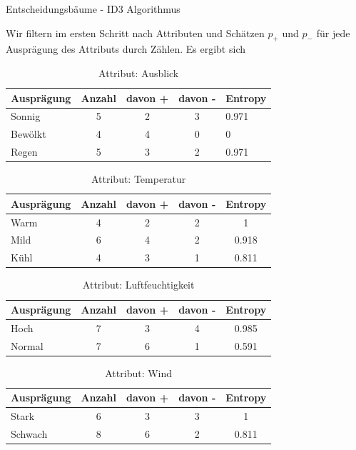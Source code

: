 \begin{task}[credit=16]{Entscheidungsbäume - ID3 Algorithmus}
\begin{subtask}[points=10,title=ID3 Algorithmus]
\begin{solution}
Wir filtern im ersten Schritt nach Attributen und Schätzen $p_+$ und $p_-$ für jede Ausprägung des Attributs durch Zählen. Es ergibt sich
\begin{table}[H]
	\centering
	\caption{Attribut: Ausblick}
	\begin{tabular}{l|c|c|c|l}
		\toprule
		\textbf{Ausprägung} & \textbf{Anzahl} & \textbf{davon +}  & \textbf{davon -} &\textbf{Entropy} \\
		\midrule
		Sonnig    & 5 &2&3&0.971   \\
		Bewölkt & 4&4&0&0  \\
		Regen    & 5&3&2&0.971    \\
		\bottomrule
	\end{tabular}
\end{table}
\begin{table}[H]
	\centering
	\caption{Attribut: Temperatur}
	\begin{tabular}{l|c|c|c|c}
		\toprule
		\textbf{Ausprägung} & \textbf{Anzahl} & \textbf{davon +}  & \textbf{davon -} &\textbf{Entropy} \\
		\midrule
		Warm  & 4 &2&2&1      \\
		Mild & 6&4&2&0.918   \\
		Kühl & 4&3&1&0.811    \\
		\bottomrule
	\end{tabular}
\end{table}
\begin{table}[H]
	\centering
	\caption{Attribut: Luftfeuchtigkeit}
	\begin{tabular}{l|c|c|c|c}
		\toprule
		\textbf{Ausprägung} & \textbf{Anzahl} & \textbf{davon +}  & \textbf{davon -} &\textbf{Entropy} \\
		\midrule
		Hoch  & 7 &3&4&0.985      \\
		Normal & 7&6&1&0.591   \\
		\bottomrule
	\end{tabular}
\end{table}
\begin{table}[H]
	\centering
	\caption{Attribut: Wind}
	\begin{tabular}{l|c|c|c|c}
		\toprule
		\textbf{Ausprägung} & \textbf{Anzahl} & \textbf{davon +}  & \textbf{davon -} &\textbf{Entropy} \\
		\midrule
		Stark  & 6 &3&3&1      \\
		Schwach &8&6&2&0.811   \\
		\bottomrule
	\end{tabular}

\end{table}
\end{solution}
\end{subtask}
\end{task}
